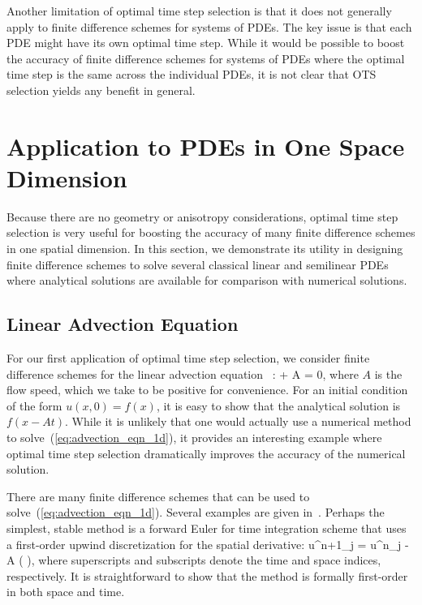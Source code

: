 \documentclass[oneeqnum,onefignum,onetabnum,onethmnum]{siamltex}
\begin{document}
Another limitation of optimal time step selection is that it does not 
generally apply to finite difference schemes for systems of PDEs.  The 
key issue is that each PDE might have its own optimal time step.  While it 
would be possible to boost the accuracy of finite difference schemes for 
systems of PDEs where the optimal time step is the same across the individual 
PDEs, it is not clear that OTS selection yields any benefit in general.


\section{\label{sec:applications_1d} 
         Application to PDEs in One Space Dimension}
Because there are no geometry or anisotropy considerations, optimal time step 
selection is very useful for boosting the accuracy of many finite difference 
schemes in one spatial dimension.  In this section, we demonstrate its 
utility in designing finite difference schemes to solve several classical 
linear and semilinear PDEs where analytical solutions are available for 
comparison with numerical solutions.


\subsection{Linear Advection Equation}
For our first application of optimal time step selection, we consider 
finite difference schemes for the linear advection equation
~\cite{leveque_book_1992, leveque_book_2002, gko_book}:
\beq
   + A  = 0,
  \label{eq:advection_eqn_1d}
\eeq
where $A$ is the flow speed, which we take to be positive for convenience.  
For an initial condition of the form $u(x,0) = f(x)$, it is easy to show 
that the analytical solution is $f(x-At)$.  While it is unlikely that one 
would actually use a numerical method to solve~(\ref{eq:advection_eqn_1d}), 
it provides an interesting example where optimal time step selection 
dramatically improves the accuracy of the numerical solution.

There are many finite difference schemes that can be used to 
solve~(\ref{eq:advection_eqn_1d}).  Several examples are given 
in~\cite{leveque_book_1992}.  Perhaps the simplest, stable method is a 
forward Euler for time integration scheme that uses a first-order upwind 
discretization for the spatial derivative:
\beq
  u^{n+1}_j = u^{n}_j 
  - A \dt \left(  \right),
  \label{eq:advection_eqn_1d_FD_scheme}
\eeq
where superscripts and subscripts denote the time and space indices, 
respectively.  It is straightforward to show that the method is formally 
first-order in both space and time.  
\end{document}
